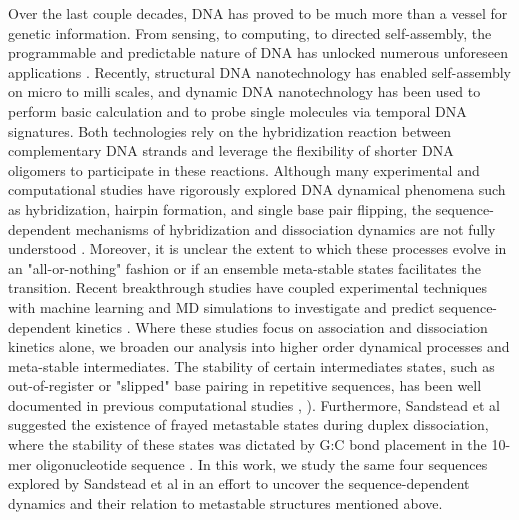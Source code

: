 \documentclass[journal=jpcbfk,manuscript=article]{achemso}
\begin{document}
Over the last couple decades, DNA has proved to be much more than a vessel for genetic information. From sensing, to computing, to directed self-assembly, the programmable and predictable nature of DNA has unlocked numerous unforeseen applications \citep{Seeman2017DNANanotechnology, Adleman1994MolecularProblems.pdf, Rothemund2006FoldingPatterns, Gu2010ALine}. Recently, structural DNA nanotechnology has enabled self-assembly on micro to milli scales, and dynamic DNA nanotechnology has been used to perform basic calculation and to probe single molecules via temporal DNA signatures\citep{MhatreV.HoJi-AnnLee2012NIHAccess, Bui2018, Shah2019}. Both technologies rely on the hybridization reaction between complementary DNA strands and leverage the flexibility of shorter DNA oligomers to participate in these reactions. Although many experimental and computational studies have rigorously explored DNA dynamical phenomena such as hybridization, hairpin formation, and single base pair flipping, the sequence-dependent mechanisms of hybridization and dissociation dynamics are not fully understood \citep{Yin2011KineticsHybridization, Xiao2019}. Moreover, it is unclear the extent to which these processes evolve in an "all-or-nothing" fashion or if an ensemble meta-stable states facilitates the transition. Recent breakthrough studies have coupled experimental techniques with machine learning and MD simulations to investigate and predict sequence-dependent kinetics \citep{Schickinger2018TetheredHelices, Zhang2018PredictingSequence}. Where these studies focus on association and dissociation kinetics alone, we broaden our analysis into higher order dynamical processes and meta-stable intermediates. The stability of certain intermediates states, such as out-of-register or "slipped" base pairing in repetitive sequences, has been well documented in previous computational studies \citep{Phys2014}, \citep{Xiao2019}). Furthermore, Sandstead et al suggested the existence of frayed metastable states during duplex dissociation, where the stability of these states was dictated by G:C bond placement in the 10-mer oligonucleotide sequence \citep{Sanstead2016}. In this work, we study the same four sequences explored by Sandstead et al in an effort to uncover the sequence-dependent dynamics and their relation to  metastable structures mentioned above.
\end{document}
